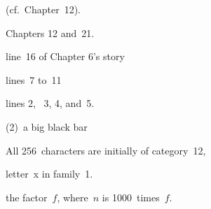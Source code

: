 (cf.~Chapter~12).

Chapters 12 and~21.

line~16 of Chapter 6's story

lines~7 to~11

lines 2,~ 3, 4, and~5.

(2)~a big black bar

All 256~characters are initially of category~12,

letter~x in family~1.

the factor~$f$, where~$n$ is 1000~times~$f$.

\bye
